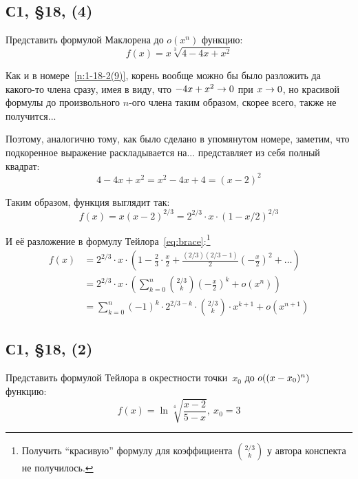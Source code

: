 \documentclass[a4paper,12pt]{article}
\begin{document}
  
  
  \subsection{С1, \S 18, (4)}
  
  Представить формулой Маклорена до $o(x^n)$ функцию:
  \[
    f(x) = x \sqrt[3]{4 - 4x + x^2}
  \]
  
  \begin{solution}
    Как и в номере~\ref{n:1-18-2(9)}, корень вообще можно бы было разложить да какого-то члена сразу, имея в виду, что $-4x \hm+ x^2 \hm\to 0$ при $x \hm\to 0$, но красивой формулы до произвольного $n$-ого члена таким образом, скорее всего, также не получится...
    
    Поэтому, аналогично тому, как было сделано в упомянутом номере, заметим, что подкоренное выражение раскладывается на... представляет из себя полный квадрат:
    \[
      4 - 4x + x^2 = x^2 - 4x + 4 = (x - 2)^2
    \]
    
    Таким образом, функция выглядит так:
    \[
      f(x) = x (x - 2)^{2/3} = 2^{2/3} \cdot x \cdot (1 - x/2)^{2/3}
    \]
    
    И её разложение в формулу Тейлора~\eqref{eq:brace}:\footnote{
      Получить ``красивую'' формулу для коэффициента $\binom{2/3}{k}$ у автора конспекта не получилось.
    }
    \begin{equation*}
    \begin{split}
      f(x) &= 2^{2/3} \cdot x \cdot \left(1 - \frac{2}{3} \cdot \frac{x}{2} + \frac{(2/3)(2/3 - 1)}{2} \left(-\frac{x}{2}\right)^2 + \ldots\right)\\
        &= 2^{2/3} \cdot x \cdot \left(\sum_{k = 0}^n \binom{2/3}{k} \left(-\frac{x}{2}\right)^k + o(x^n)\right)\\
        &= \sum_{k = 0}^n (-1)^k \cdot 2^{2/3 - k} \cdot \binom{2/3}{k} \cdot x^{k + 1} + o(x^{n + 1})
    \end{split}
    \end{equation*}
  \end{solution}
  
  
  
  \subsection{С1, \S 18, (2)}
  
  Представить формулой Тейлора в окрестности точки~$x_0$ до $o((x \hm- x_0)^n)$ функцию:
  \[
    f(x) = \ln{\sqrt[4]{\frac{x - 2}{5 - x}}},\ x_0 = 3
  \]
  
\end{document}
